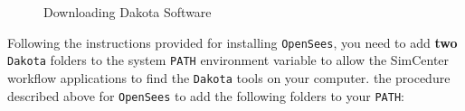 \begin{figure}[!htbp]
  \caption{Downloading Dakota Software}
  \label{fig:dakota_installation}
\end{figure}


Following the instructions provided for installing \texttt{OpenSees}, you need to add \textbf{two} \texttt{Dakota} folders to the system \texttt{PATH} environment variable to allow the SimCenter workflow applications to find the \texttt{Dakota} tools on your computer. 
the procedure described above for \texttt{OpenSees} to add the following
folders to your \texttt{PATH}:

